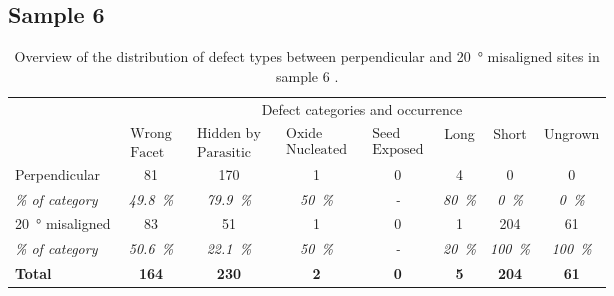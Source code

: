 \subsection{Sample 6}

\begin{table}
    \centering
    \caption[Overview of the distribution of defect types in sample 6.]{Overview of the distribution of defect types between perpendicular and \qty{20}{\degree} misaligned sites in sample 6 \cite{Brugnolotto2023_2}.}
    \begin{tabular}{l|ccccccc}
        \hline
         & \multicolumn{7}{c}{Defect categories and occurrence} \\ 
         & $\begin{matrix} \text{Wrong} \\ \text{Facet} \end{matrix}$ & $\begin{matrix} \text{Hidden by} \\ \text{Parasitic} \end{matrix}$ & $\begin{matrix} \text{Oxide} \\ \text{Nucleated} \end{matrix}$ & $\begin{matrix} \text{Seed} \\ \text{Exposed} \end{matrix}$ & Long & Short & Ungrown \\ 
        \hline \hline
        Perpendicular & \num{81} & \num{170} & \num{1} & \num{0} & \num{4} & \num{0} & \num{0} \\ 
        \textit{\% of category} & \textit{\qty{49.8}{\%}} & \textit{\qty{79.9}{\%}} & \textit{\qty{50}{\%}} & \textit{-} & \textit{\qty{80}{\%}} & \textit{\qty{0}{\%}} & \textit{\qty{0}{\%}} \\ 
        \hline
        \qty{20}{\degree} misaligned & \num{83} & \num{51} & \num{1} & \num{0} & \num{1} & \num{204} & \num{61} \\ 
        \textit{\% of category} & \textit{\qty{50.6}{\%}} & \textit{\qty{22.1}{\%}} & \textit{\qty{50}{\%}} & \textit{-} & \textit{\qty{20}{\%}} & \textit{\qty{100}{\%}} & \textit{\qty{100}{\%}} \\ 
        \hline
        \textbf{Total} & \textbf{\num{164}} & \textbf{\num{230}} & \textbf{\num{2}} & \textbf{\num{0}} & \textbf{\num{5}} & \textbf{\num{204}} & \textbf{\num{61}} \\
        \hline
    \end{tabular}
    \label{tab:defects_s6}
\end{table}


